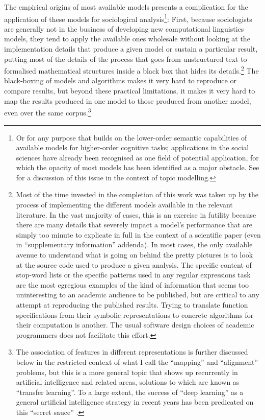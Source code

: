 The empirical origins of most available models presents a complication for the application of these models for sociological analysis\footnote{
    \label{foot:opacity}
    Or for any purpose that builds on the lower-order semantic capabilities of available models for higher-order cognitive tasks; applications in the social sciences have already been recognised as one field of potential application, for which the opacity of most models has been identified as a major obstacle.
    See \citet{ramage2009} for a discussion of this issue in the context of topic modelling.
}:
First, because sociologists are generally not in the business of developing new computational linguistics models, they tend to apply the available ones wholesale without looking at the implementation details that produce a given model or sustain a particular result, putting most of the details of the process that goes from unstructured text to formalised mathematical structures inside a black box that hides its details.\footnote{
    \label{foot:impl}
    Most of the time invested in the completion of this work was taken up by the process of implementing the different models available in the relevant literature.
    In the vast majority of cases, this is an exercise in futility because there are many details that severely impact a model's performance that are simply too minute to explicate in full in the context of a scientific paper (even in ``supplementary information'' addenda).
    In most cases, the only available avenue to understand what is going on behind the pretty pictures is to look at the source code used to produce a given analysis.
    The specific content of stop-word lists or the specific patterns used in any regular expressions task are the most egregious examples of the kind of information that seems too uninteresting to an academic audience to be published, but are critical to any attempt at reproducing the published results.
    Trying to translate function specifications from their symbolic representations to concrete algorithms for their computation is another.
    The usual software design choices of academic programmers does not facilitate this effort.
}
The black-boxing of models and algorithms makes it very hard to reproduce or compare results, but beyond these practical limitations, it makes it very hard to map the results produced in one model to those produced from another model, even over the same corpus.\footnote{
    \label{foot:sauce}
    The association of features in different representations is further discussed below in the restricted context of what I call the ``mapping'' and ``alignment'' problems, but this is a more general topic that shows up recurrently in artificial intelligence and related areas, solutions to which are known as ``transfer learning''.
    To a large extent, the success of ``deep learning'' as a general artificial intelligence strategy in recent years has been predicated on this ``secret sauce'' \citep{luong2013}.
}

